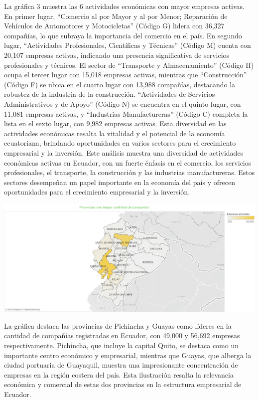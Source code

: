 \documentclass[
]{article}
\begin{document}
La gráfica 3 muestra las 6 actividades económicas con mayor empresas
activas. En primer lugar, ``Comercio al por Mayor y al por Menor;
Reparación de Vehículos de Automotores y Motocicletas'' (Código G)
lidera con 36,327 compañías, lo que subraya la importancia del comercio
en el país. En segundo lugar, ``Actividades Profesionales, Científicas y
Técnicas'' (Código M) cuenta con 20,107 empresas activas, indicando una
presencia significativa de servicios profesionales y técnicos. El sector
de ``Transporte y Almacenamiento'' (Código H) ocupa el tercer lugar con
15,018 empresas activas, mientras que ``Construcción'' (Código F) se
ubica en el cuarto lugar con 13,988 compañías, destacando la robustez de
la industria de la construcción. ``Actividades de Servicios
Administrativos y de Apoyo'' (Código N) se encuentra en el quinto lugar,
con 11,081 empresas activas, y ``Industrias Manufactureras'' (Código C)
completa la lista en el sexto lugar, con 9,982 empresas activas. Esta
diversidad en las actividades económicas resalta la vitalidad y el
potencial de la economía ecuatoriana, brindando oportunidades en varios
sectores para el crecimiento empresarial y la inversión. Este análisis
muestra una diversidad de actividades económicas activas en Ecuador, con
un fuerte énfasis en el comercio, los servicios profesionales, el
transporte, la construcción y las industrias manufactureras. Estos
sectores desempeñan un papel importante en la economía del país y
ofrecen oportunidades para el crecimiento empresarial y la inversión.

\includegraphics{imagenes/Hoja 5.png}

La gráfica destaca las provincias de Pichincha y Guayas como líderes en
la cantidad de compañías registradas en Ecuador, con 49,000 y 56,692
empresas respectivamente. Pichincha, que incluye la capital Quito, se
destaca como un importante centro económico y empresarial, mientras que
Guayas, que alberga la ciudad portuaria de Guayaquil, muestra una
impresionante concentración de empresas en la región costera del país.
Esta ilustración resalta la relevancia económica y comercial de estas
dos provincias en la estructura empresarial de Ecuador.
\end{document}
